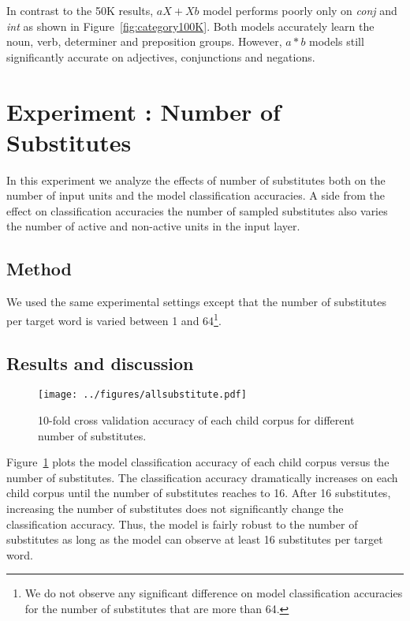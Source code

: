 In contrast to the 50K results, $aX+Xb$ model performs poorly only on {\it
conj} and {\it int} as shown in Figure~\ref{fig:category100K}.  Both models
accurately learn the noun, verb, determiner and preposition groups.  However,
$a*b$ models still significantly accurate on adjectives, conjunctions and
negations.

\section{Experiment : Number of Substitutes}
\label{s:exp_substitutes}
In this experiment we analyze the effects of number of substitutes both on the
number of input units and the model classification accuracies.  A side from the
effect on classification accuracies the number of sampled substitutes also
varies the number of active and non-active units in the input layer.  

\subsection{Method} 
We used the same experimental settings except that the number of substitutes
per target word is varied between 1 and 64\footnote{We do not observe any
significant difference on model classification accuracies for the number of
substitutes that are more than 64.}.

\subsection{Results and discussion}
\begin{figure}[ht]
  \centering
  \texttt{[image: ../figures/allsubstitute.pdf]}
  \caption{10-fold cross validation accuracy of each child corpus for different
  number of substitutes.}
  \label{fig:substitutes}
\end{figure} 

Figure~\ref{fig:substitutes} plots the model classification accuracy of each
child corpus versus the number of substitutes.  The classification accuracy
dramatically increases on each child corpus until the number of substitutes
reaches to 16. After 16 substitutes, increasing the number of substitutes
does not significantly change the classification accuracy. Thus, the 
model is fairly robust to the number of substitutes as long as the
model can observe at least 16 substitutes per target word.

